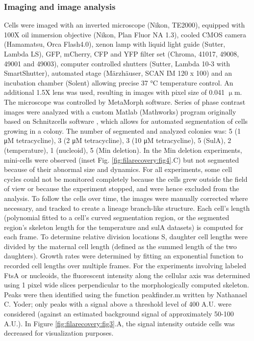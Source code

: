 \subsubsection{Imaging and image analysis}
Cells were imaged with an inverted microscope (Nikon, TE2000), equipped with 100X oil immersion objective (Nikon, Plan Fluor NA 1.3), cooled CMOS camera (Hamamatsu, Orca Flash4.0), xenon lamp with liquid light guide (Sutter, Lambda LS), GFP, mCherry, CFP and YFP filter set (Chroma, 41017, 49008, 49001 and 49003), computer controlled shutters (Sutter, Lambda 10‐3 with SmartShutter), automated stage (Märzhäuser, SCAN IM 120 x 100) and an incubation chamber (Solent) allowing precise 37 °C temperature control. An additional 1.5X lens was used, resulting in images with pixel size of 0.041 $\upmu$m. The microscope was controlled by MetaMorph software. Series of phase contrast images were analyzed with a custom Matlab (Mathworks) program originally based on Schnitzcells software \cite{Young2012}, which allows for automated segmentation of cells growing in a colony. The number of segmented and analyzed colonies was: 5 (1 μM tetracycline), 3 (2 μM tetracycline), 3 (10 μM tetracycline), 5 (SulA), 2 (temperature), 1 (nucleoid), 5 (Min deletion). In the Min deletion experiments, mini-cells were observed (inset Fig. \ref{fig:filarecovery:fig4}.C) but not segmented because of their abnormal size and dynamics. For all experiments, some cell cycles could not be monitored completely because the cells grew outside the field of view or because the experiment stopped, and were hence excluded from the analysis. To follow the cells over time, the images were manually corrected where necessary, and tracked to create a lineage branch-like structure. Each cell’s length (polynomial fitted to a cell’s curved segmentation region, or the segmented region's skeleton length for the temperature and sulA datasets) is computed for each frame. To determine relative division locations S, daughter cell lengths were divided by the maternal cell length (defined as the summed length of the two daughters). Growth rates were determined by fitting an exponential function to recorded cell lengths over multiple frames. For the experiments involving labeled FtsA or nucleoids, the fluorescent intensity along the cellular axis was determined using 1 pixel wide slices perpendicular to the morphologically computed skeleton. Peaks were then identified using the function peakfinder.m written by Nathanael C. Yoder; only peaks with a signal above a threshold level of 400 A.U. were considered (against an estimated background signal of approximately 50-100 A.U.). In Figure \ref{fig:filarecovery:fig3}.A, the signal intensity outside cells was decreased for visualization purposes.


